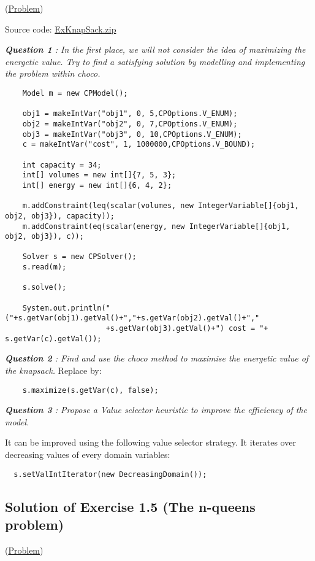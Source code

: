 (\hyperlink{exercises:exercise1.4}{Problem})

Source code: \href{media/zip/exknapsack.zip}{ExKnapSack.zip}

\noindent\emph{\textbf{Question 1} : In the first place, we will not consider the idea of maximizing the energetic value. Try to find a satisfying solution by modelling and implementing the problem within choco.}

\begin{lstlisting}
	Model m = new CPModel();
	
	obj1 = makeIntVar("obj1", 0, 5,CPOptions.V_ENUM);
	obj2 = makeIntVar("obj2", 0, 7,CPOptions.V_ENUM);
	obj3 = makeIntVar("obj3", 0, 10,CPOptions.V_ENUM);
	c = makeIntVar("cost", 1, 1000000,CPOptions.V_BOUND);
	
	int capacity = 34;
	int[] volumes = new int[]{7, 5, 3};
	int[] energy = new int[]{6, 4, 2};
	
	m.addConstraint(leq(scalar(volumes, new IntegerVariable[]{obj1, obj2, obj3}), capacity));
	m.addConstraint(eq(scalar(energy, new IntegerVariable[]{obj1, obj2, obj3}), c));
	
	Solver s = new CPSolver();
	s.read(m);

	s.solve();
	
	System.out.println("("+s.getVar(obj1).getVal()+","+s.getVar(obj2).getVal()+","
                       +s.getVar(obj3).getVal()+") cost = "+ s.getVar(c).getVal());
\end{lstlisting}

\noindent\emph{\textbf{Question 2} : Find and use the choco method to maximise the energetic value of the knapsack.}
Replace  by:
\begin{lstlisting}
	s.maximize(s.getVar(c), false);
\end{lstlisting}

\noindent\emph{\textbf{Question 3} : Propose a Value selector heuristic to improve the efficiency of the model.}

It can be improved using the following value selector strategy. It iterates over decreasing values of every domain variables: 
\begin{lstlisting}
  s.setValIntIterator(new DecreasingDomain());
\end{lstlisting}

\subsection{Solution of Exercise 1.5 (The n-queens problem)}\label{solutions:solutionofexercise1.5}\hypertarget{solutions:solutionofexercise1.5}{}
(\hyperlink{exercises:exercise1.5}{Problem})

